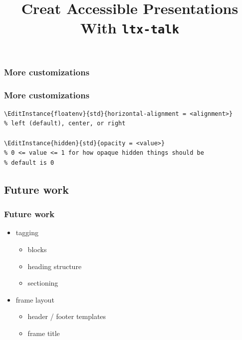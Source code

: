 \documentclass{ltx-talk}
\begin{document}
\subsubsection{More customizations}

\begin{frame*}
\frametitle{More customizations}
\begin{lstlisting}
\EditInstance{floatenv}{std}{horizontal-alignment = <alignment>}
% left (default), center, or right

\EditInstance{hidden}{std}{opacity = <value>}
% 0 <= value <= 1 for how opaque hidden things should be
% default is 0
\end{lstlisting}
\end{frame*}

\subsection{Future work}

\begin{frame}
\frametitle{Future work}
\begin{itemize}
\item tagging
\begin{itemize}
\item blocks
\item heading structure
\item sectioning
\end{itemize}
\item frame layout
\begin{itemize}
\item header / footer templates
\item frame title
\end{itemize}
\end{itemize}
\end{frame}

\title{Creat Accessible Presentations With \texttt{ltx-talk}}

\end{document}
